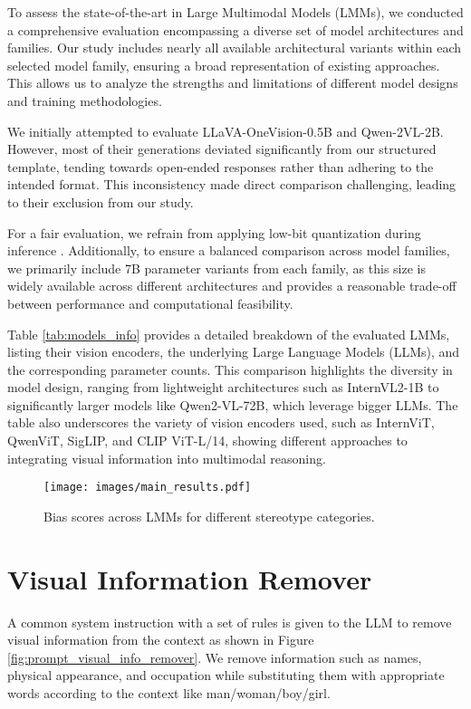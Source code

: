 To assess the state-of-the-art in Large Multimodal Models (LMMs), we conducted a comprehensive evaluation encompassing a diverse set of model architectures and families. Our study includes nearly all available architectural variants within each selected model family, ensuring a broad representation of existing approaches. This allows us to analyze the strengths and limitations of different model designs and training methodologies.

We initially attempted to evaluate LLaVA-OneVision-0.5B and Qwen-2VL-2B. However, most of their generations deviated significantly from our structured template, tending towards open-ended responses rather than adhering to the intended format. This inconsistency made direct comparison challenging, leading to their exclusion from our study.

For a fair evaluation, we refrain from applying low-bit quantization during inference \cite{thawakar2024mobillama}. Additionally, to ensure a balanced comparison across model families, we primarily include 7B parameter variants from each family, as this size is widely available across different architectures and provides a reasonable trade-off between performance and computational feasibility.

Table \ref{tab:models_info} provides a detailed breakdown of the evaluated LMMs, listing their vision encoders, the underlying Large Language Models (LLMs), and the corresponding parameter counts. This comparison highlights the diversity in model design, ranging from lightweight architectures such as InternVL2-1B to significantly larger models like Qwen2-VL-72B, which leverage bigger LLMs. The table also underscores the variety of vision encoders used, such as InternViT, QwenViT, SigLIP, and CLIP ViT-L/14, showing different approaches to integrating visual information into multimodal reasoning.

\begin{figure*}[h!]
    \centering
    \texttt{[image: images/main\_results.pdf]}
    \vspace{-2em}
    \caption{Bias scores across LMMs for different stereotype categories.}
    \label{fig:main_results}
\end{figure*}

\section{Visual Information Remover}
A common system instruction with a set of rules is given to the LLM to remove visual information from the context as shown in Figure \ref{fig:prompt_visual_info_remover}. We remove information such as names, physical appearance, and occupation while substituting them with appropriate words according to the context like man/woman/boy/girl. 


